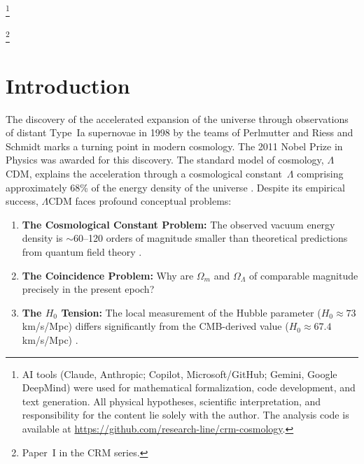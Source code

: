 \documentclass[aps,prd,twocolumn,superscriptaddress,nofootinbib]{revtex4-2}
\begin{document}

\thanks{AI tools (Claude, Anthropic; Copilot, Microsoft/GitHub; Gemini, Google DeepMind) were used for mathematical formalization, code development, and text generation. All physical hypotheses, scientific interpretation, and responsibility for the content lie solely with the author. The analysis code is available at \url{https://github.com/research-line/crm-cosmology}.}

\thanks{Paper~I in the CRM series.}

\maketitle


\section{Introduction}
\label{sec:introduction}

The discovery of the accelerated expansion of the universe through observations of distant Type~Ia supernovae in 1998 by the teams of Perlmutter \cite{Perlmutter1999} and Riess and Schmidt \cite{Riess1998} marks a turning point in modern cosmology. The 2011 Nobel Prize in Physics was awarded for this discovery. The standard model of cosmology, $\Lambda$CDM, explains the acceleration through a cosmological constant~$\Lambda$ comprising approximately 68\% of the energy density of the universe \cite{Planck2020}. Despite its empirical success, $\Lambda$CDM faces profound conceptual problems:

\begin{enumerate}
\item \textbf{The Cosmological Constant Problem:} The observed vacuum energy density is $\sim$60--120 orders of magnitude smaller than theoretical predictions from quantum field theory \cite{Weinberg1989}.
\item \textbf{The Coincidence Problem:} Why are $\Omega_m$ and $\Omega_\Lambda$ of comparable magnitude precisely in the present epoch?
\item \textbf{The $H_0$ Tension:} The local measurement of the Hubble parameter ($H_0 \approx 73$\,km/s/Mpc) differs significantly from the CMB-derived value ($H_0 \approx 67.4$\,km/s/Mpc) \cite{Planck2020, Riess2022}.
\end{enumerate}
\end{document}
